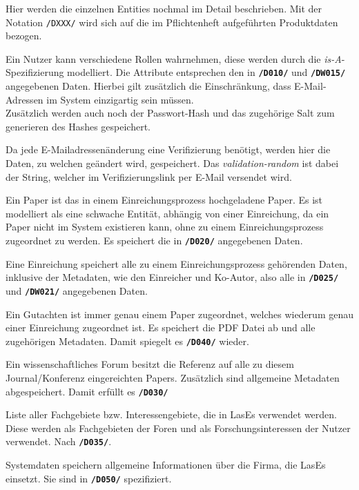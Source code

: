 Hier werden die einzelnen Entities nochmal im Detail beschrieben. Mit der Notation \texttt{/DXXX/} wird sich auf die im Pflichtenheft aufgeführten Produktdaten bezogen.

\begin{description}
	 Ein Nutzer kann verschiedene Rollen wahrnehmen, diese werden durch die \emph{is-A}-Spezifizierung modelliert. Die Attribute entsprechen den in \texttt{\textbf{/D010/}} und \texttt{\textbf{/DW015/}} angegebenen Daten. Hierbei gilt zusätzlich die Einschränkung, dass E-Mail-Adressen im System einzigartig sein müssen. \\Zusätzlich werden auch noch der Passwort-Hash und das zugehörige Salt zum generieren des Hashes gespeichert.

	 Da jede E-Mailadressenänderung eine Verifizierung benötigt, werden hier die Daten, zu welchen geändert wird, gespeichert. Das \emph{validation-random} ist dabei der String, welcher im Verifizierungslink per E-Mail versendet wird.

	 Ein Paper ist das in einem Einreichungsprozess hochgeladene Paper. Es ist modelliert als eine schwache Entität, abhängig von einer Einreichung, da ein Paper nicht im System existieren kann, ohne zu einem Einreichungsprozess zugeordnet zu werden. Es speichert die in \texttt{\textbf{/D020/}} angegebenen Daten.

	 Eine Einreichung speichert alle zu einem Einreichungsprozess gehörenden Daten, inklusive der Metadaten, wie den Einreicher und Ko-Autor, also alle in \texttt{\textbf{/D025/}} und \texttt{\textbf{/DW021/}} angegebenen Daten.

	 Ein Gutachten ist immer genau einem Paper zugeordnet, welches wiederum genau einer Einreichung zugeordnet ist. Es speichert die PDF Datei ab und alle zugehörigen Metadaten.
	Damit spiegelt es \texttt{\textbf{/D040/}} wieder.

	 Ein wissenschaftliches Forum besitzt die Referenz auf alle zu diesem Journal/Konferenz eingereichten Papers. Zusätzlich sind allgemeine Metadaten abgespeichert. Damit erfüllt es \texttt{\textbf{/D030/}}

	 Liste aller Fachgebiete bzw. Interessengebiete, die in LasEs verwendet werden. Diese werden als Fachgebieten der Foren und als Forschungsinteressen der Nutzer verwendet. Nach \texttt{\textbf{/D035/}}.

	 Systemdaten speichern allgemeine Informationen über die Firma, die LasEs einsetzt. Sie sind in \texttt{\textbf{/D050/}} spezifiziert.

\end{description}
